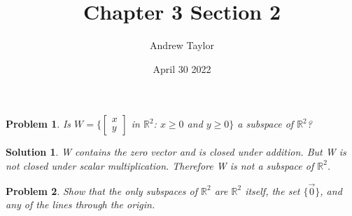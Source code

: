 \documentclass{article}
\title{Chapter 3 Section 2}
\author{Andrew Taylor}
\date{April 30 2022}
\newtheorem{problem}{Problem}
\newtheorem*{solution}{Solution}
\begin{document}
\maketitle

\begin{problem}
Is $W = \Bigg \{ \begin{bmatrix} x \\ y \end{bmatrix}$ in $\mathbb{R}^2$: $x \geq 0$ and $y \geq 0 \Bigg \}$ a subspace of $\mathbb{R}^2$?
\end{problem}

\begin{solution} 
W contains the zero vector and is closed under addition. But W is not closed under scalar multiplication. Therefore W is not a subspace of $\mathbb{R}^2$.
\end{solution}

\begin{problem}
Show that the only subspaces of $\mathbb{R}^2$ are $\mathbb{R}^2$ itself, the set $\{ \vec{0} \}$, and any of the lines through the origin.
\end{problem}
\end{document}
